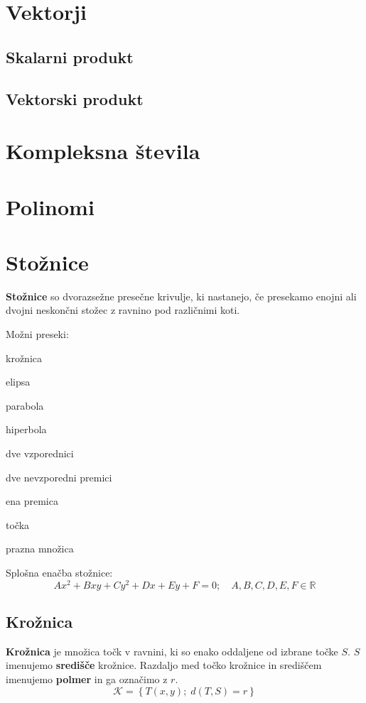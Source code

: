 \documentclass[a4paper,oneside,12pt,fleqn]{article}
\def\R{\ensuremath{\mathbb R}}
\numberwithin{equation}{section}
\newenvironment{itemize*}%
{
\vspace{-12pt}%
\begin{itemize}%
\setlength{\itemsep}{0pt}%
\setlength{\parskip}{2pt}}%
{\end{itemize}}
\begin{document}
\section{Vektorji}
\label{sec:vec}

\subsection{Skalarni produkt}
\label{sec:vec:skal}

\subsection{Vektorski produkt}
\label{sec:vec:vec}

\section{Kompleksna števila}
\label{sec:kompl}

\section{Polinomi}
\label{sec:pol}

\section{Stožnice}
\label{sec:kroz}
\textbf{Stožnice} so dvorazsežne presečne krivulje, ki nastanejo, če presekamo enojni ali dvojni
neskončni stožec z ravnino pod različnimi koti.

Možni preseki:
\begin{itemize*}
  \item krožnica
  \item elipsa
  \item parabola
  \item hiperbola
  \item dve vzporednici
  \item dve nevzporedni premici
  \item ena premica
  \item točka
  \item prazna množica
\end{itemize*}

Splošna enačba stožnice:
\begin{equation}
  Ax^2 + Bxy + Cy^2 + Dx + Ey + F = 0; \quad A, B, C, D, E, F \in \R
  \label{eq:stoz:def}
\end{equation}

\subsection{Krožnica}
\label{sec:stoz:kroz}
\textbf{Krožnica} je množica točk v ravnini, ki so enako oddaljene od izbrane točke $S$. $S$
imenujemo \textbf{središče} krožnice. Razdaljo med točko krožnice in središčem imenujemo
\textbf{polmer} in
ga označimo z $r$.
\[ \mathcal{K} = \left\{ T(x, y); \; d(T, S) = r \right\} \]
\end{document}
